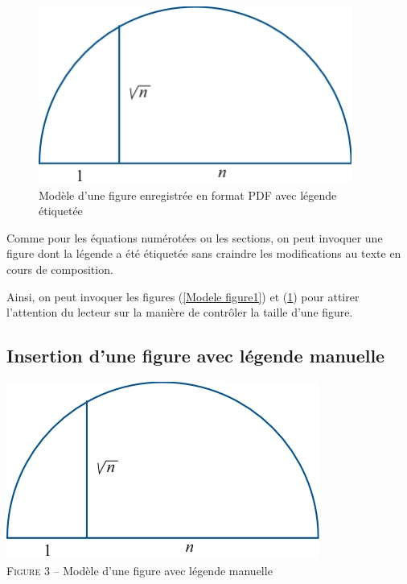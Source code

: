 \documentclass[10pt]{article}
\begin{document}
\begin{figure}[ht]
\centerline{\includegraphics[scale=.99]{pics/Figure2}} \caption{ \label{Modele figure2} Modèle d'une figure enregistrée en format PDF avec  légende étiquetée}
\end{figure}

Comme pour les équations numérotées ou les sections, on peut invoquer
une figure dont la légende a été étiquetée sans craindre les
modifications au texte en cours de composition.

Ainsi, on peut invoquer les figures (\ref{Modele figure1}) et
(\ref{Modele figure2}) pour attirer l'attention du lecteur sur la
manière de contrôler la taille d'une figure.

\hypertarget{insertion-dune-figure-avec-legende-manuelle}{%
\subsection{\texorpdfstring{Insertion d'une figure avec légende manuelle
\label{leg+manu}}{Insertion d'une figure avec légende manuelle }}\label{insertion-dune-figure-avec-legende-manuelle}}

\begin{center}
\includegraphics[scale=.99]{pics/Figure1}\\
{\small \textsc{Figure 3} -- Modèle d'une figure avec légende manuelle}
\end{center}
\end{document}
